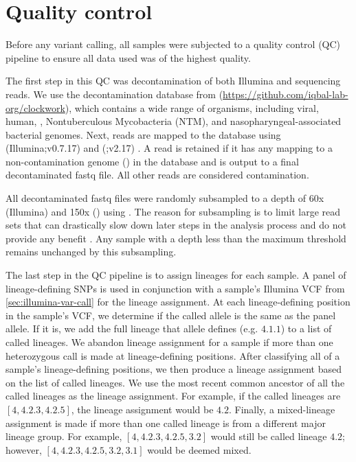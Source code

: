 \section{Quality control}
\label{sec:ch2-qc}

Before any variant calling, all samples were subjected to a quality control (QC) pipeline to ensure all data used was of the highest quality. 

The first step in this QC was decontamination of both Illumina and \ont{} sequencing reads. We use the decontamination database from  (\url{https://github.com/iqbal-lab-org/clockwork}), which contains a wide range of organisms, including viral, human, \mtb{}, Nontuberculous Mycobacteria (NTM), and nasopharyngeal-associated bacterial genomes. Next, reads are mapped to the database using  (Illumina;v0.7.17) \cite{li2013} and  (\ont{};v2.17) \cite{li2018}. A read is retained if it has any mapping to a non-contamination genome (\mtb{}) in the database and is output to a final decontaminated fastq file. All other reads are considered contamination. 

All decontaminated fastq files were randomly subsampled to a depth of 60x (Illumina) and 150x (\ont{}) using  \cite{rasusa2019}. The reason for subsampling is to limit large read sets that can drastically slow down later steps in the analysis process and do not provide any benefit \cite{demaio2019}. Any sample with a depth less than the maximum threshold remains unchanged by this subsampling.  

The last step in the QC pipeline is to assign lineages for each sample. A panel of lineage-defining SNPs \cite{Shitikov2017,Rutaihwa2019,stucki2016} is used in conjunction with a sample's Illumina VCF from \autoref{sec:illumina-var-call} for the lineage assignment. At each lineage-defining position in the sample's VCF, we determine if the called allele is the same as the panel allele. If it is, we add the full lineage that allele defines (e.g. $4.1.1$) to a list of called lineages. We abandon lineage assignment for a sample if more than one heterozygous call is made at lineage-defining positions. After classifying all of a sample's lineage-defining positions, we then produce a lineage assignment based on the list of called lineages. We use the most recent common ancestor of all the called lineages as the lineage assignment. For example, if the called lineages are $[4, 4.2.3, 4.2.5]$, the lineage assignment would be $4.2$. Finally, a mixed-lineage assignment is made if more than one called lineage is from a different major lineage group. For example, $[4, 4.2.3, 4.2.5, 3.2]$ would still be called lineage $4.2$; however, $[4, 4.2.3, 4.2.5, 3.2, 3.1]$ would be deemed mixed.

